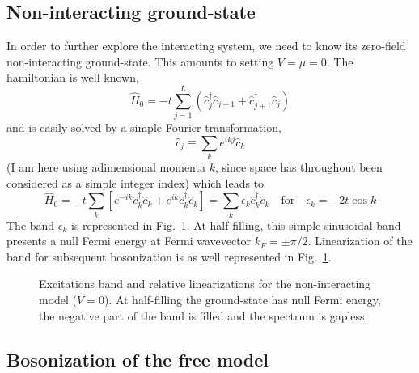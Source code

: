 \subsection{Non-interacting ground-state}

In order to further explore the interacting system, we need to know its zero-field non-interacting ground-state. This amounts to setting $V=\mu=0$. The hamiltonian is well known,
\[
	\hat H_0 = -t \sum_{j=1}^{L} \left(
		\hat c_j^\dagger \hat c_{j+1} + \hat c_{j+1}^\dagger \hat c_j
	\right)
\]
and is easily solved by a simple Fourier transformation,
\[
	\hat c_j \equiv \sum_k e^{ikj} \hat c_k
\]
(I am here using adimensional momenta $k$, since space has throughout been considered as a simple integer index) which leads to
\begin{equation}\label{eq:XY-hamiltonian}
	\hat H_0 = -t \sum_k \left[
		e^{-ik} \hat c_k^\dagger \hat c_k + e^{ik} \hat c_k^\dagger \hat c_k
	\right] = \sum_k \epsilon_k \hat c_k^\dagger \hat c_k
	\quad\text{for}\quad
	\epsilon_k = -2t \cos k
\end{equation}
The band $\epsilon_k$ is represented in Fig.~\ref{fig:XY-band}. At half-filling, this simple sinusoidal band presents a null Fermi energy at Fermi wavevector $k_F = \pm \pi/2$. Linearization of the band for subsequent bosonization is as well represented in Fig.~\ref{fig:XY-band}.

\begin{figure}
	\centering
	
	\caption{Excitations band and relative linearizations for the non-interacting model ($V=0$). At half-filling the ground-state has null Fermi energy, the negative part of the band is filled and the spectrum is gapless.}
	\label{fig:XY-band}
\end{figure}

\subsection{Bosonization of the free model}

